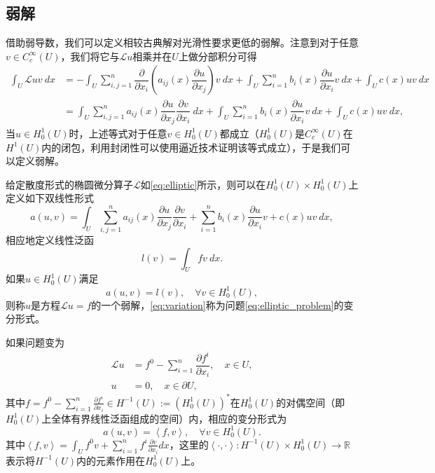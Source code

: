 \documentclass[a4paper,10pt]{ctexart}
\begin{document}
\subsection{弱解}
借助弱导数，我们可以定义相较古典解对光滑性要求更低的弱解。注意到对于任意$ v\in C^\infty_c(U) $，我们将它与$ \mathcal{L}u $相乘并在$ U $上做分部积分可得
\begin{equation}
    \begin{aligned}
        \int_U \mathcal{L}u v \ dx &= -\int_U \sum_{i,j=1}^n \dfrac{\partial}{\partial x_i} \left( a_{ij}(x) \dfrac{\partial u}{\partial x_j} \right) v \ dx + \int_U \sum_{i=1}^n b_i(x) \dfrac{\partial u}{\partial x_i} v \ dx + \int_U c(x)uv \ dx \\
        &= \int_U \sum_{i,j=1}^n a_{ij}(x) \dfrac{\partial u}{\partial x_j} \dfrac{\partial v}{\partial x_i} \ dx + \int_U \sum_{i=1}^n b_i(x) \dfrac{\partial u}{\partial x_i} v \ dx + \int_U c(x)uv \ dx,
    \end{aligned}
\end{equation}
当$ u\in H^1_0(U) $时，上述等式对于任意$ v\in H^1_0(U) $都成立（$ H^1_0(U) $是$ C^\infty_c(U) $在$ H^1(U) $内的闭包，利用封闭性可以使用逼近技术证明该等式成立），于是我们可以定义弱解。
\begin{definition}
    给定散度形式的椭圆微分算子$ \mathcal{L} $如\eqref{eq:elliptic}所示，则可以在$ H^1_0(U)\times H^1_0(U) $上定义如下双线性形式
    \begin{equation}
        a(u,v) = \int_U \sum_{i,j=1}^n a_{ij}(x) \dfrac{\partial u}{\partial x_j} \dfrac{\partial v}{\partial x_i} + \sum_{i=1}^n b_i(x) \dfrac{\partial u}{\partial x_i} v + c(x)uv \ dx,
    \end{equation}
    相应地定义线性泛函
    \begin{equation}
        l(v) = \int_U f v \ dx.
    \end{equation}
    如果$ u\in H^1_0(U) $满足
    \begin{equation}\label{eq:variation}
        a(u,v) = l(v),\quad \forall v\in H^1_0(U),
    \end{equation}
    则称$ u $是方程$ \mathcal{L}u = f $的一个弱解，\eqref{eq:variation}称为问题\eqref{eq:elliptic_problem}的变分形式。
\end{definition}
如果问题变为
\[
    \begin{aligned}
        \mathcal{L}u &= f^0-\sum_{i=1}^n \dfrac{\partial f^i}{\partial x_i} , \quad x\in U,\\
        u &= 0, \quad x\in \partial U,
    \end{aligned}  
\]
其中$ f = f^0-\sum_{i=1}^n \frac{\partial f^i}{\partial x_i} \in H^{-1}(U) :=(H^1_0(U))^* $在$ H^1_0(U) $的对偶空间（即$ H^1_0(U) $上全体有界线性泛函组成的空间）内，相应的变分形式为
\[
    a(u,v) = \left<f,v\right>,\quad \forall v\in H^1_0(U).
\]
其中$ \left<f,v\right> = \int_U f^0v + \sum_{i=1}^n f^i\frac{\partial v}{\partial x_i} dx $，这里的$ \left<\cdot,\cdot \right>: H^{-1}(U)\times H^1_0(U) \to \mathbb{R} $表示将$ H^{-1}(U) $内的元素作用在$ H^1_0(U) $上。
\end{document}
